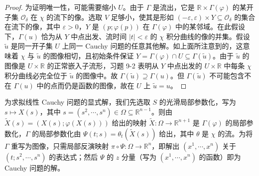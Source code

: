 \documentclass[../../main.tex]{subfiles}
\begin{document}
\begin{proof}
为证明唯一性，可能需要缩小 $U$。由于 $\Gamma$ 是流出，它是 $\mathbb{R}\times\Gamma(\varphi)$ 的某开子集 $\mathcal{O}_\delta$ 在 $\chi$ 的流下的像。选取 $V$ 足够小，使其是形如 $(-\varepsilon,\varepsilon)\times Y\subseteq\mathcal{O}_\delta$ 的集合在流下的像，其中 $\varepsilon>0$，$Y$ 是 $(p;\varphi(p))$ 在 $\Gamma(\varphi)$ 中的某邻域。在此假设下，$\Gamma(u)$ 恰为从 $Y$ 中点出发、流时间 $|t|<\varepsilon$ 的 $\chi$ 积分曲线的像的并集。假设 $\widetilde{u}$ 是同一开子集 $U$ 上同一 Cauchy 问题的任意其他解。如上面所注意到的，这意味着 $\chi$ 与 $\widetilde{u}$ 的图像相切，且初始条件保证 $Y=\Gamma(\varphi)\cap U\subseteq\Gamma(\widetilde{u})$。由于 $\widetilde{u}$ 的图像是 $U\times\mathbb{R}$ 的正常嵌入子流形，习题 9-2 表明从 $Y$ 中点出发的 $U\times\mathbb{R}$ 中每条 $\chi$ 积分曲线必完全位于 $\widetilde{u}$ 的图像中。故 $\Gamma(\widetilde{u})\supseteq\Gamma(u)$。但 $\Gamma(\widetilde{u})$ 不可能包含不在 $\Gamma(u)$ 中的点而仍是函数的图像，故在 $U$ 上 $\widetilde{u}=u$。
\end{proof}

为求拟线性 Cauchy 问题的显式解，我们先选取 $S$ 的光滑局部参数化，写为 $s\mapsto X(s)$，其中 $s=(s^2,\cdots ,s^n)\in\Omega\subseteq\mathbb{R}^{n-1}$。则由 $\widetilde{X}(s)=(X(s);\varphi(X(s)))$ 给出的映射 $\widetilde{X}\colon\Omega\to\mathbb{R}^{n+1}$ 是 $\Gamma(\varphi)$ 的局部参数化，$\Gamma$ 的局部参数化由 $\Psi(t;s)=\theta_t(\widetilde{X}(s))$ 给出，其中 $\theta$ 是 $\chi$ 的流。为将 $\Gamma$ 重写为图像，只需局部反演映射 $\pi\circ\Psi\colon\Omega\to\mathbb{R}^n$，即解出 $(x^1,\cdots ,x^n)$ 关于 $(t;s^2,\cdots ,s^n)$ 的表达式；然后 $\Psi$ 的 $z$ 分量（写为 $(x^1,\cdots ,x^n)$ 的函数）即为 Cauchy 问题的解。
\end{document}
